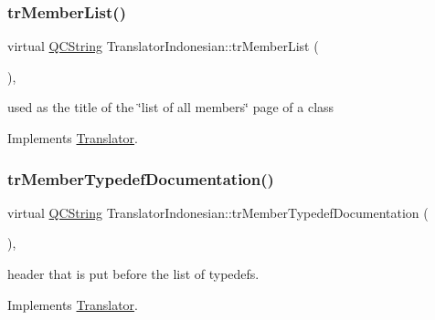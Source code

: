 \mbox{\label{class_translator_indonesian_a2e04d0526f66bd9d4aeee949baacb3c7}} 
\subsubsection{\texorpdfstring{trMemberList()}{trMemberList()}}
{\footnotesize\ttfamily virtual \mbox{\hyperlink{class_q_c_string}{Q\+C\+String}} Translator\+Indonesian\+::tr\+Member\+List (\begin{DoxyParamCaption}{ }\end{DoxyParamCaption})\hspace{0.3cm}{\ttfamily [inline]}, {\ttfamily [virtual]}}

used as the title of the \char`\"{}list of all members\char`\"{} page of a class 

Implements \mbox{\hyperlink{class_translator}{Translator}}.

\mbox{\label{class_translator_indonesian_abc1a5f7d034f6cad0292792216cb3318}} 
\subsubsection{\texorpdfstring{trMemberTypedefDocumentation()}{trMemberTypedefDocumentation()}}
{\footnotesize\ttfamily virtual \mbox{\hyperlink{class_q_c_string}{Q\+C\+String}} Translator\+Indonesian\+::tr\+Member\+Typedef\+Documentation (\begin{DoxyParamCaption}{ }\end{DoxyParamCaption})\hspace{0.3cm}{\ttfamily [inline]}, {\ttfamily [virtual]}}

header that is put before the list of typedefs. 

Implements \mbox{\hyperlink{class_translator}{Translator}}.

\mbox{\label{class_translator_indonesian_a2e81037b931cc6363914f84aec128176}} 
